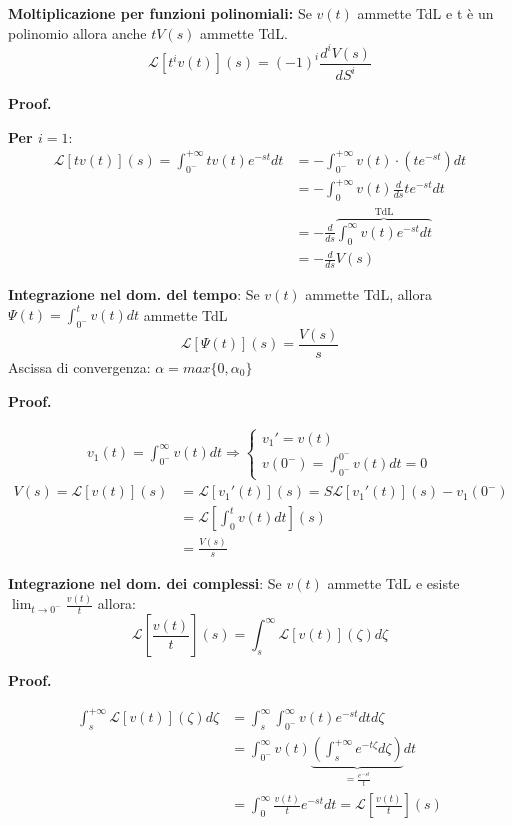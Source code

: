 \documentclass[a4paper]{article}
\newtheorem{property}[theorem]{Propriety}
\theoremstyle{definition}
\theoremstyle{remark}
\renewenvironment{proof}[1][Proof]{%
  \begin{mdframed}[linewidth=0.8pt, roundcorner=5pt, linecolor=black, skipabove=\baselineskip, skipbelow=\baselineskip, innertopmargin=5pt, innerbottommargin=5pt]%
  \noindent\textbf{#1. }%
}{%
  \end{mdframed}%
}
\renewenvironment{property}{\begin{oldproperty}}{\end{oldproperty}}
\begin{document}
\begin{property}
    \label{prop:molt_funz_pol}
    \textbf{Moltiplicazione per funzioni polinomiali:} Se $v(t)$ ammette TdL e t è un polinomio allora anche $tV(s)$ ammette TdL.
    \[\mathcal{L}[t^iv(t)](s) = (-1)^i\frac{d^iV(s)}{dS^i}\]
\end{property}
\begin{proof}
    \textbf{Per $i = 1$}: 
    \begin{align*}
        \mathcal{L}[tv(t)](s) = \int_{0^-}^{+\infty} tv(t)e^{-st}dt &= -\int_{0^-}^{+\infty}v(t) \cdot (te^{-st})dt\\
        &= -\int_{0}^{+\infty} v(t)\frac{d}{ds}te^{-st}dt \\
        &= -\frac{d}{ds}\overbrace{\int_{0}^{\infty}v(t)e^{-st}dt}^{\text{TdL}}\\
        &= -\frac{d}{ds}V(s)
    \end{align*}
\end{proof}
\begin{property}
    \textbf{Integrazione nel dom. del tempo}: Se $v(t)$ ammette TdL, allora $\Psi(t) = \int_{0^-}^{t}v(t)dt$ ammette TdL
    \[\mathcal{L}[\Psi(t)](s) = \frac{V(s)}{s}\]
    Ascissa di convergenza: $\alpha = max\{0, \alpha_0\}$
\end{property}
\begin{proof}
    \begin{align*}
        v_1(t) = \int_{0^-}^{\infty} v(t)dt \Longrightarrow \begin{cases}
            v_1' = v(t)\\
            v(0^-) = \int_{0^-}^{0^-}v(t)dt = 0
        \end{cases}
    \end{align*}
    \begin{align*}
        V(s) = \mathcal{L}[v(t)](s) &= \mathcal{L}[v_1'(t)](s) = S\mathcal{L}[v_1'(t)](s) - v_1(0^-)\\
        &= \mathcal{L}\left[\int_{0}^{t}v(t)dt\right](s)\\ &= \frac{V(s)}{s}
    \end{align*}
\end{proof}
\begin{property}
    \textbf{Integrazione nel dom. dei complessi}: Se $v(t)$ ammette TdL e esiste $\lim_{t \rightarrow 0^-}\frac{v(t)}{t}$
    allora:
    \[\mathcal{L}\left[\frac{v(t)}{t}\right](s) = \int_{s}^{\infty} \mathcal{L}[v(t)](\zeta)d\zeta\]
\end{property}
\begin{proof}
    \begin{align*}
        \int_{s}^{+\infty} \mathcal{L}[v(t)](\zeta)d\zeta &= \int_{s}^{\infty} \int_{0^-}^{\infty} v(t)e^{-st} dtd\zeta\\
        &= \int_{0^-}^{\infty} v(t)\underbrace{\left(\int_{s}^{+\infty}e^{-t\zeta}d\zeta\right)}_{= \frac{e^{-st}}{t}}dt\\
        &= \int_{0}^{\infty}\frac{v(t)}{t}e^{-st}dt = \mathcal{L}\left[\frac{v(t)}{t}\right](s)
    \end{align*}
\end{proof}
\end{document}
